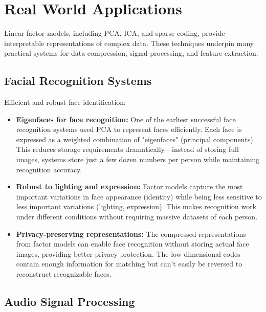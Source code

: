 
\section{Real World Applications}
\label{sec:linear-factor-real-world}

Linear factor models, including PCA, ICA, and sparse coding, provide interpretable representations of complex data. These techniques underpin many practical systems for data compression, signal processing, and feature extraction.

\subsection{Facial Recognition Systems}

Efficient and robust face identification:

\begin{itemize}
    \item \textbf{Eigenfaces for face recognition:} One of the earliest successful face recognition systems used PCA to represent faces efficiently. Each face is expressed as a weighted combination of "eigenfaces" (principal components). This reduces storage requirements dramatically—instead of storing full images, systems store just a few dozen numbers per person while maintaining recognition accuracy.
    
    \item \textbf{Robust to lighting and expression:} Factor models capture the most important variations in face appearance (identity) while being less sensitive to less important variations (lighting, expression). This makes recognition work under different conditions without requiring massive datasets of each person.
    
    \item \textbf{Privacy-preserving representations:} The compressed representations from factor models can enable face recognition without storing actual face images, providing better privacy protection. The low-dimensional codes contain enough information for matching but can't easily be reversed to reconstruct recognizable faces.
\end{itemize}

\subsection{Audio Signal Processing}


